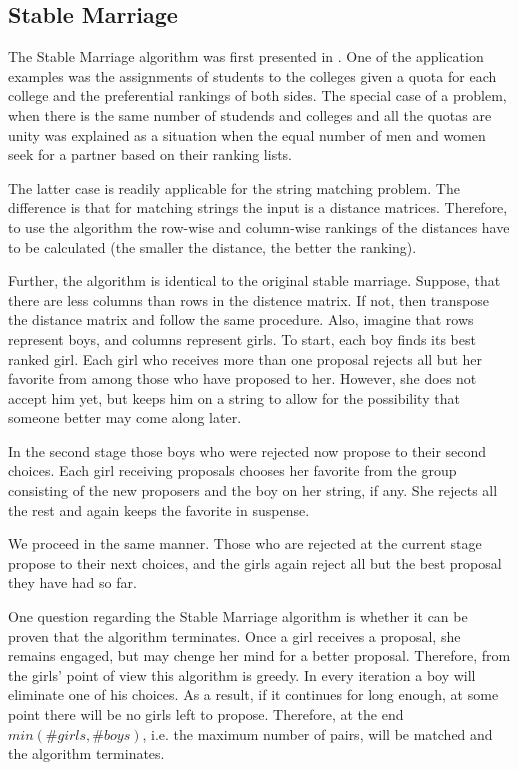 \documentclass[a4paper,11pt]{article}
\begin{document}
\subsection{Stable Marriage}

The Stable Marriage algorithm was first presented in \cite{gale}. One of the application examples was the assignments of students to the colleges given a quota for each college and the preferential rankings of both sides. The special case of a problem, when there is the same number of studends and colleges and all the quotas are unity was explained as a situation when the equal number of men and women seek for a partner based on their ranking lists.

The latter case is readily applicable for the string matching problem. The difference is that for matching strings the input is a distance matrices. Therefore, to use the algorithm the row-wise and column-wise rankings of the distances have to be calculated (the smaller the distance, the better the ranking).

Further, the algorithm is identical to the original stable marriage. Suppose, that there are less columns than rows in the distence matrix. If not, then transpose the distance matrix and follow the same procedure. Also, imagine that rows represent boys, and columns represent girls. To start, each boy finds its best ranked girl. Each girl who receives more than one proposal rejects all but her favorite from among those who have proposed to her. However, she does not accept him yet, but keeps him on a string to allow for the possibility that someone better may come along later.

In the second stage those boys who were rejected now propose to their second choices. Each girl receiving proposals chooses her favorite from the group consisting of the new proposers and the boy on her string, if any. She rejects all the rest and again keeps the favorite in suspense.

We proceed in the same manner. Those who are rejected at the current stage propose to their next choices, and the girls again reject all but the best proposal they have had so far.

One question regarding the Stable Marriage algorithm is whether it can be proven that the algorithm terminates. Once a girl receives a proposal, she remains engaged, but may chenge her mind for a better proposal. Therefore, from the girls' point of view this algorithm is greedy. In every iteration a boy will eliminate one of his choices. As a result, if it continues for long enough, at some point there will be no girls left to propose. Therefore, at the end $min(\#girls, \#boys)$, i.e. the maximum number of pairs, will be matched and the algorithm terminates.
\end{document}
